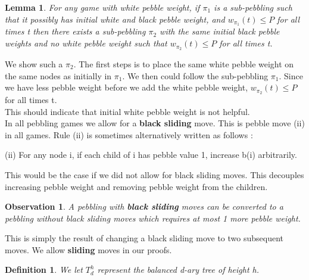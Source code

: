 \documentclass[12pt]{article}
\newenvironment{proofL}{\hspace{.4em}}
                      {\hspace{\fill}{$\blacksquare$} \smallskip}
\newtheorem{lemma}[theorem]{Lemma}
\newtheorem{obs}[theorem]{Observation}
\newtheorem{definition}[theorem]{Definition}
\begin{document}
\begin{lemma}
For any game with white pebble weight, if $\pi_1$ is a sub-pebbling such that it possibly has initial white and black pebble weight, and $w_{\pi_1}(t) \leq P$ for all times t then there exists a sub-pebbling $\pi_2$ with the same initial black pebble weights and no white pebble weight such that $w_{\pi_2}(t) \leq P$ for all times t.
\end{lemma}

\begin{proofL}
We show such a $\pi_2$. The first steps is to place the same white pebble weight on the same nodes as initially in $\pi_1$. We then could follow the sub-pebbling $\pi_1$. Since we have less pebble weight before we add the white pebble weight, $w_{\pi_2}(t) \leq P$ for all times t.
\end{proofL}\\

This should indicate that initial white pebble weight is not helpful.\\

In all pebbling games we allow for a {\bf black sliding} move. This is pebble move (ii) in all games. Rule (ii) is sometimes alternatively written as follows :

\noindent
(ii) For any node i, if each child of i has pebble value 1, increase b(i) arbitrarily.

This would be the case if we did not allow for black sliding moves. This decouples increasing pebble weight and removing pebble weight from the children.


\begin{obs}
A pebbling with {\bf black sliding} moves can be converted to a pebbling without black sliding moves which requires at most 1 more pebble weight.
\end{obs}

\begin{proofL}
This is simply the result of changing a black sliding move to two subsequent moves. We allow {\bf sliding} moves in our proofs.
\end{proofL}

\begin{definition}
We let $T^h_d$ represent the balanced d-ary tree of height h.
\end{definition}

\newpage	
\end{document}
